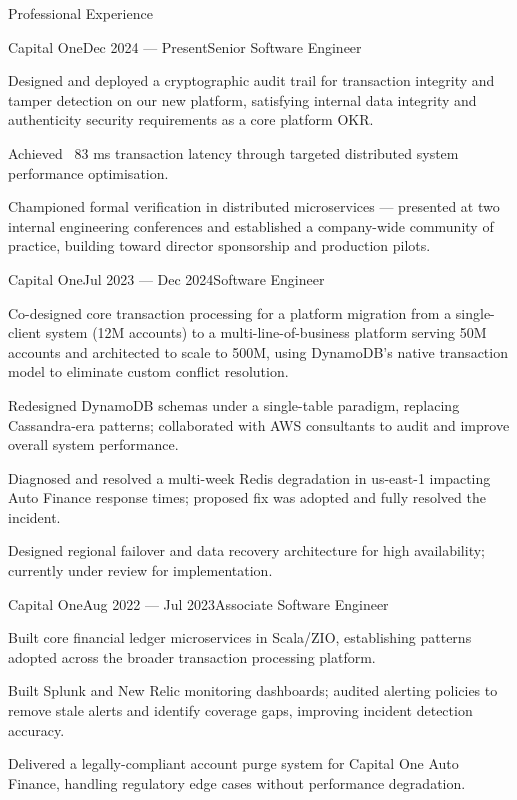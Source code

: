 \documentclass{resume}
\begin{document}
\begin{rSection}{Professional Experience}

\begin{rSubsection}{Capital One}{Dec 2024 --- Present}{Senior Software Engineer}{}
\item Designed and deployed a cryptographic audit trail for transaction integrity and tamper detection on our new platform, satisfying internal data integrity and authenticity security requirements as a core platform OKR.
\item Achieved ~83 ms transaction latency through targeted distributed system performance optimisation.
\item Championed formal verification in distributed microservices --- presented at two internal engineering conferences and established a company-wide community of practice, building toward director sponsorship and production pilots.
\end{rSubsection}

\begin{rSubsection}{Capital One}{Jul 2023 --- Dec 2024}{Software Engineer}{}
\item Co-designed core transaction processing for a platform migration from a single-client system (12M accounts) to a multi-line-of-business platform serving 50M accounts and architected to scale to 500M, using DynamoDB's native transaction model to eliminate custom conflict resolution.
\item Redesigned DynamoDB schemas under a single-table paradigm, replacing Cassandra-era patterns; collaborated with AWS consultants to audit and improve overall system performance.
\item Diagnosed and resolved a multi-week Redis degradation in us-east-1 impacting Auto Finance response times; proposed fix was adopted and fully resolved the incident.
\item Designed regional failover and data recovery architecture for high availability; currently under review for implementation.
\end{rSubsection}

\begin{rSubsection}{Capital One}{Aug 2022 --- Jul 2023}{Associate Software Engineer}{}
\item Built core financial ledger microservices in Scala/ZIO, establishing patterns adopted across the broader transaction processing platform.
\item Built Splunk and New Relic monitoring dashboards; audited alerting policies to remove stale alerts and identify coverage gaps, improving incident detection accuracy.
\item Delivered a legally-compliant account purge system for Capital One Auto Finance, handling regulatory edge cases without performance degradation.
\end{rSubsection}

\end{rSection}
\end{document}
